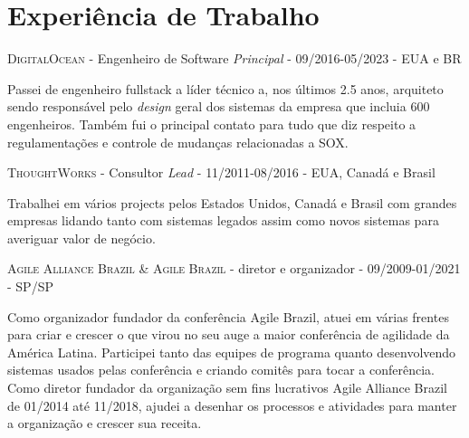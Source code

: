 \documentclass[letter,10pt]{article}
\begin{document}
\section{Experiência de Trabalho}

\textsc{DigitalOcean} - Engenheiro de Software \emph{Principal} - \textsc{09/2016}-\textsc{05/2023} - EUA e BR

Passei de engenheiro fullstack a líder técnico a, nos últimos 2.5 anos, arquiteto sendo responsável pelo \emph{design} geral dos sistemas da empresa que incluia 600 engenheiros. Também fui o principal contato para tudo que diz respeito a regulamentações e controle de mudanças relacionadas a SOX.

\textsc{ThoughtWorks} - Consultor \emph{Lead} - \textsc{11/2011}-\textsc{08/2016} - EUA, Canadá e Brasil

Trabalhei em vários projects pelos Estados Unidos, Canadá e Brasil com grandes empresas lidando tanto com sistemas legados assim como novos sistemas para averiguar valor de negócio.

\textsc{Agile Alliance Brazil \& Agile Brazil} - diretor e organizador - \textsc{09/2009}-\textsc{01/2021} - SP/SP

Como organizador fundador da conferência Agile Brazil, atuei em várias frentes para criar e crescer o que virou no seu auge a maior conferência de agilidade da América Latina. Participei tanto das equipes de programa quanto desenvolvendo sistemas usados pelas conferência e criando comitês para tocar a conferência.
Como diretor fundador da organização sem fins lucrativos Agile Alliance Brazil de 01/2014 até 11/2018, ajudei a desenhar os processos e atividades para manter a organização e crescer sua receita.
\end{document}
